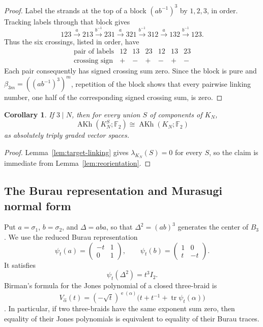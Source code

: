 \documentclass[10pt,a4paper]{amsart}
\newtheorem{corollary}[theorem]{Corollary}
\newcommand{\F}{\mathbb F_2}
\newcommand{\AKh}{\operatorname{AKh}}
\newcommand{\tr}{\operatorname{tr}}
\newcommand{\e}{\operatorname{e}}
\begin{document}
\begin{proof}
Label the strands at the top of a block \((ab^{-1})^3\) by \(1,2,3\), in order.
Tracking labels through that block gives
\[
  123\xrightarrow{a}213\xrightarrow{b^{-1}}231
  \xrightarrow{a}321\xrightarrow{b^{-1}}312
  \xrightarrow{a}132\xrightarrow{b^{-1}}123.
\]
Thus the six crossings, listed in order, have
\[
\begin{array}{c|cccccc}
\text{pair of labels}&12&13&23&12&13&23\\
\text{crossing sign}&+&-&+&-&+&-
\end{array}
\]
Each pair consequently has signed crossing sum zero.  Since the block is pure and
\(\beta_{3m}=((ab^{-1})^3)^m\), repetition of the block shows that every pairwise
linking number, one half of the corresponding signed crossing sum, is zero.
\end{proof}

\begin{corollary}\label{cor:target-reorientations}
If \(3\mid N\), then for every union \(S\) of components of \(K_N\),
\[
  \AKh(K_N^S;\F)\cong\AKh(K_N;\F)
\]
as absolutely triply graded vector spaces.
\end{corollary}

\begin{proof}
Lemma~\ref{lem:target-linking} gives \(\lambda_{K_N}(S)=0\) for every \(S\), so the
claim is immediate from Lemma~\ref{lem:reorientation}.
\end{proof}

\subsection{The Burau representation and Murasugi normal form}

Put \(a=\sigma_1\), \(b=\sigma_2\), and \(\Delta=aba\), so that
\(\Delta^2=(ab)^3\) generates the center of \(B_3\).  We use the reduced Burau
representation
\begin{equation}\label{eq:burau}
  \psi_t(a)=
  \begin{pmatrix}-t&1\\0&1\end{pmatrix},
  \qquad
  \psi_t(b)=
  \begin{pmatrix}1&0\\t&-t\end{pmatrix}.
\end{equation}
It satisfies
\begin{equation}\label{eq:center}
  \psi_t(\Delta^2)=t^3 I_2.
\end{equation}
Birman's formula for the Jones polynomial of a closed three-braid is
\begin{equation}\label{eq:birman}
  V_{\widehat\alpha}(t)
  =(-\sqrt t)^{\e(\alpha)}
    \bigl(t+t^{-1}+\tr\psi_t(\alpha)\bigr)
\end{equation}
\cite{Birman}.  In particular, if two three-braids have the same exponent sum zero,
then equality of their Jones polynomials is equivalent to equality of their Burau
traces.
\end{document}
